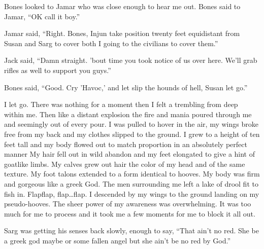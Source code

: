 Bones looked to Jamar who was close enough to hear me out. Bones said to Jamar, ``OK call it boy.''

Jamar said, ``Right. Bones, Injun take position twenty feet equidistant from Susan and Sarg to cover both I going to the civilians to cover them.''

Jack said, ``Damn straight. 'bout time you took notice of us over here. We'll grab rifles as well to support you guys.''

Bones said, ``Good. Cry 'Havoc,' and let slip the hounds of hell, Susan let go.''


\parasep

I let go. There was nothing for a moment then I felt a trembling from deep within me. Then like a distant explosion the fire and mania poured through me and seemingly out of every pour. I was pulled to hover in the air, my wings broke free from my back and my clothes slipped to the ground. I grew to a height of ten feet tall and my body flowed out to match proportion in an absolutely perfect manner My hair fell out in wild abandon and my feet elongated to give a hint of goatlike limbs. My calves grew out hair the color of my head and of the same texture. My foot talons extended to a form identical to hooves. My body was firm and gorgeous like a greek God. The men surrounding me left a lake of drool fit to fish in. Flapflap, flap\dots flap. I descended by my wings to the ground landing on my pseudo-hooves. The sheer power of my awareness was overwhelming. It was too much for me to process and it took me a few moments for me to block it all out.

Sarg was getting his senses back slowly, enough to say, ``That ain't no red. She be a greek god maybe or some fallen angel but she ain't be no red by God.''



















